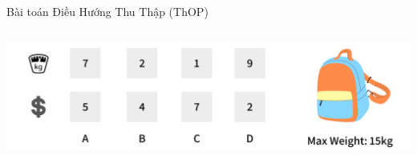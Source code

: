 \documentclass[aspectratio=169]{beamer}
\begin{document}
\begin{frame}{Bài toán Điều Hướng Thu Thập (ThOP)}
{\begin{columns}
            \begin{column}{0.45\textwidth}
                \begin{center}
                    \includegraphics[scale=0.15]{img/knapsack.png}
                \end{center}
            \end{column}
        \end{columns}
    }

\end{frame}
\end{document}
